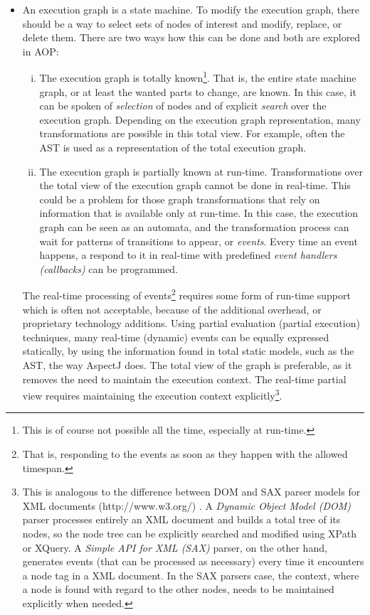 \begin{itemize}
\item An execution graph is a state machine. To modify the execution graph, there should be a way to select sets of nodes of interest and modify, replace, or delete them. There are two ways how this can be done and both are explored in AOP:

\begin{enumerate}[i.]
\item The execution graph is totally known\footnote{This is of course not possible all the time, especially at run-time.}. That is, the entire state machine graph, or at least the wanted parts to change, are known. In this case, it can be spoken of \textit{selection} of nodes and of explicit \textit{search} over the execution graph. Depending on the execution graph representation, many transformations are possible in this total view. For example, often the AST is used as a representation of the total execution graph.
 \item The execution graph is partially known at run-time. Transformations over the total view of the execution graph cannot be done in real-time. This could be a problem for those graph transformations that rely on information that is available only at run-time. In this case, the execution graph can be seen as an automata, and the transformation process can wait for patterns of transitions to appear, or \textit{events}. Every time an event happens, a respond to it in real-time with predefined \textit{event handlers (callbacks)} can be programmed.
\end{enumerate}

The real-time processing of events\footnote{That is, responding to the events as soon as they happen with the allowed timespan.} requires some form of run-time support which is often not acceptable, because of the additional overhead, or proprietary technology additions. Using partial evaluation \cite{jonesetal.93} (partial execution) techniques, many real-time (dynamic) events can be equally expressed statically, by using the information found in total static models, such as the AST, the way AspectJ does. The total view of the graph is preferable, as it removes the need to maintain the execution context. The real-time partial view requires maintaining the execution context explicitly\footnote{This is analogous to the difference between DOM and SAX parser models for XML documents (http://www.w3.org/) \cite{mcl.01}. A \textit{Dynamic Object Model (DOM)} parser processes entirely an XML document and builds a total tree of its nodes, so the node tree can be explicitly searched and modified using XPath or XQuery. A \textit{Simple API for XML (SAX)} parser, on the other hand, generates events (that can be processed as necessary) every time it encounters a node tag in a XML document. In the SAX parsers case, the context, where a node is found with regard to the other nodes, needs to be maintained explicitly when needed.}.


\end{itemize}
